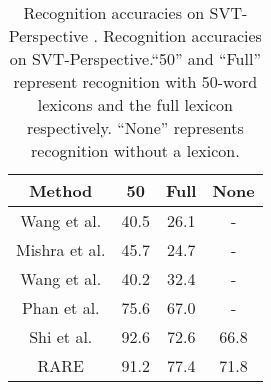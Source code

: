 \documentclass[10pt,twocolumn,letterpaper]{article}
\begin{document}
\begin{table}
	\caption{Recognition accuracies on SVT-Perspective \cite{quy2013recognizing}. Recognition accuracies on SVT-Perspective.``50'' and ``Full'' represent recognition with 50-word lexicons and the
		full lexicon respectively. ``None'' represents recognition without a lexicon.}\label{t1}
	\begin{center}
		\begin{tabular}{c c c c }
			\hline
			Method & 50  & Full & None \\
			\hline
			Wang et al. \cite{wang2011end} & 40.5 & 26.1 & - \\
			Mishra et al. \cite{mishra2012scene} & 45.7 & 24.7 & - \\
			Wang et al. \cite{wang2012end} & 40.2 & 32.4 & - \\
			Phan et al. \cite{quy2013recognizing} & 75.6 & 67.0 & - \\
			Shi et al. \cite{shi2017end} & 92.6 & 72.6 & 66.8 \\
			RARE & 91.2 & 77.4 & 71.8 \\
			\hline
		\end{tabular}
	\end{center}
\end{table}


{\small


}
\end{document}
